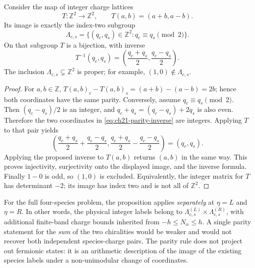 \begin{proposition}
\label{prop:ch21-parity-lattice}
Consider the map of integer charge lattices
\begin{equation}
 T:\mathbb Z^2\longrightarrow\mathbb Z^2,
 \qquad T(a,b)=(a+b,a-b).
 \label{eq:ch21-parity-map}
\end{equation}
Its image is exactly the index-two subgroup
\begin{equation}
 \Lambda_{c,s}
 =\{(q_c,q_s)\in\mathbb Z^2:q_c\equiv q_s\pmod2\}.
 \label{eq:ch21-parity-sublattice}
\end{equation}
On that subgroup $T$ is a bijection, with inverse
\begin{equation}
 T^{-1}(q_c,q_s)
 =\left(\frac{q_c+q_s}{2},\frac{q_c-q_s}{2}\right).
 \label{eq:ch21-parity-inverse}
\end{equation}
The inclusion $\Lambda_{c,s}\subsetneq\mathbb Z^2$ is proper;
for example, $(1,0)\notin\Lambda_{c,s}$.
\end{proposition}
\begin{proof}
For $a,b\in\mathbb Z$,
$T(a,b)_c-T(a,b)_s=(a+b)-(a-b)=2b$;
hence both coordinates have the same parity.  Conversely, assume
$q_c\equiv q_s\pmod2$.  Then $(q_c-q_s)/2$ is an integer, and
$q_c+q_s=(q_c-q_s)+2q_s$ is also even.  Therefore the two coordinates
in \eqref{eq:ch21-parity-inverse} are integers.  Applying $T$
to that pair yields
\begin{equation*}
  \left(\frac{q_c+q_s}{2}+\frac{q_c-q_s}{2},
        \frac{q_c+q_s}{2}-\frac{q_c-q_s}{2}\right)=(q_c,q_s).
\end{equation*}
Applying the proposed inverse to $T(a,b)$ returns $(a,b)$ in the
same way.  This proves injectivity, surjectivity onto the displayed
image, and the inverse formula.  Finally $1-0$ is odd, so $(1,0)$
is excluded.  Equivalently, the integer matrix for $T$ has determinant
$-2$; its image has index two and is not all of $\mathbb Z^2$.
\end{proof}

For the full four-species problem, the proposition applies
\emph{separately} at $\eta=L$ and $\eta=R$.  In other words, the
physical integer labels belong to
$\Lambda_{c,s}^{(L)}\times\Lambda_{c,s}^{(R)}$, with additional
finite-band charge bounds inherited from $-h\leq N_\alpha\leq h$.
A single parity statement for the \emph{sum} of the two chiralities
would be weaker and would not recover both independent species-charge
pairs.  The parity rule does not project out fermionic states: it is an
arithmetic description of the image of the existing species labels
under a non-unimodular change of coordinates.

